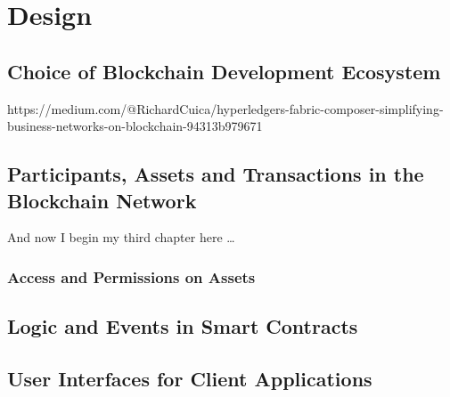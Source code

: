 \chapter{Design}

\section{Choice of Blockchain Development Ecosystem}

https://medium.com/@RichardCuica/hyperledgers-fabric-composer-simplifying-business-networks-on-blockchain-94313b979671

\section{Participants, Assets and Transactions in the Blockchain Network}
And now I begin my third chapter here \dots

\subsection{Access and Permissions on Assets}

\section{Logic and Events in Smart Contracts}

\section{User Interfaces for Client Applications}